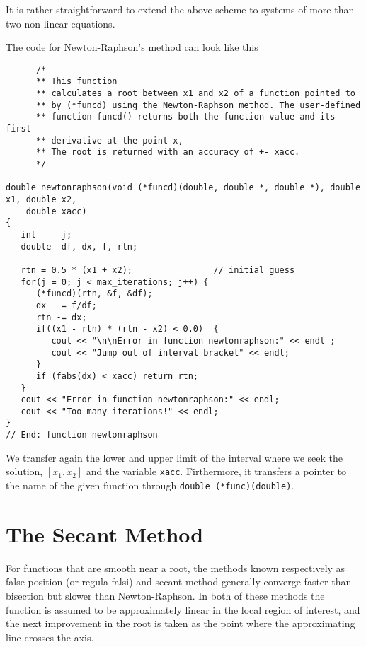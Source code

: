 It is rather straightforward to extend the above scheme to systems of
more than two non-linear equations. 

The code for Newton-Raphson's method can look like this
\lstset{language=c++}
\begin{lstlisting}
      /*
      ** This function
      ** calculates a root between x1 and x2 of a function pointed to
      ** by (*funcd) using the Newton-Raphson method. The user-defined
      ** function funcd() returns both the function value and its first
      ** derivative at the point x,
      ** The root is returned with an accuracy of +- xacc.
      */

double newtonraphson(void (*funcd)(double, double *, double *), double x1, double x2,
	double xacc)
{
   int     j;
   double  df, dx, f, rtn;

   rtn = 0.5 * (x1 + x2);                // initial guess 
   for(j = 0; j < max_iterations; j++) {
      (*funcd)(rtn, &f, &df);
      dx   = f/df;
      rtn -= dx;
      if((x1 - rtn) * (rtn - x2) < 0.0)  {
         cout << "\n\nError in function newtonraphson:" << endl ;
         cout << "Jump out of interval bracket" << endl;
      }
      if (fabs(dx) < xacc) return rtn;
   }
   cout << "Error in function newtonraphson:" << endl;  
   cout << "Too many iterations!" << endl;
}
// End: function newtonraphson

\end{lstlisting}
We transfer again the lower and upper limit of the
interval where we seek the solution, $[x_1,x_2]$ and the variable 
\verb$xacc$.
Firthermore, it transfers a pointer to the name
of the given function through \lstinline{double (*func)(double)}.



\section{The Secant Method} 
\label{sec:secfalse}

For functions that are smooth near a root, the methods known respectively
as false position (or regula falsi) and secant method generally converge faster than
bisection but slower than Newton-Raphson. In both of these methods the function is assumed to be approximately
linear in the local region of interest, and the next improvement in the root is taken as
the point where the approximating line crosses the axis.
 
